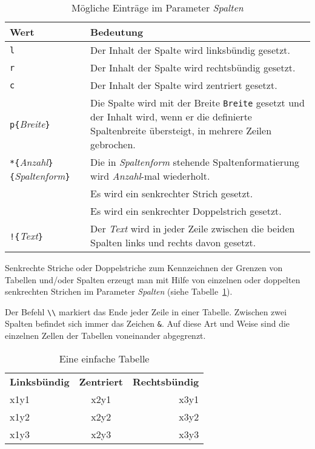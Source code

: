 \begin{table}[htb]
	\centering
	\caption{Mögliche Einträge im Parameter \textsl{Spalten}}
	\label{Tabelle_Spaltenformatierungseintrag}       %
	\begin{tabularx}{\textwidth}{lX}
		\hline
		Wert & Bedeutung \\
		\hline
		\texttt{l} & Der Inhalt der Spalte wird linksbündig gesetzt. \\
		\texttt{r} & Der Inhalt der Spalte wird rechtsbündig gesetzt. \\
		\texttt{c} & Der Inhalt der Spalte wird zentriert gesetzt. \\
		\texttt{p\{}\textsl{Breite}\texttt{\}} & Die Spalte wird mit der Breite \texttt{Breite} gesetzt und der Inhalt wird, wenn er die definierte Spaltenbreite übersteigt, in mehrere Zeilen gebrochen.  \\
		\texttt{*\{}\textsl{Anzahl}\texttt{\}\{}\textsl{Spaltenform}\texttt{\}} & 
		Die in \textsl{Spaltenform} stehende Spaltenformatierung 
		wird \textsl{Anzahl}-mal wiederholt. \\
		\texttt{\textbar} & Es wird ein senkrechter Strich gesetzt. \\
		\texttt{\textbar\textbar} & Es wird ein senkrechter Doppelstrich gesetzt. \\
		\texttt{!\{}\textsl{Text}\texttt{\}} & Der \textsl{Text} wird in jeder Zeile
		zwischen die beiden 
		Spalten links und rechts davon gesetzt.  \\
		\hline
	\end{tabularx}
\end{table}


Senkrechte Striche oder Doppelstriche zum Kennzeichnen der 
Grenzen von Tabellen und/oder Spalten erzeugt man mit 
Hilfe von einzelnen oder doppelten 
senkrechten Strichen im Parameter \textsl{Spalten} 
(siehe Tabelle~\ref{Tabelle_Spaltenformatierungseintrag}).




Der Befehl \verb!\\! markiert das Ende jeder Zeile in einer Tabelle.
Zwischen zwei Spalten befindet sich immer das Zeichen \verb!&!. Auf diese
Art und Weise sind die einzelnen Zellen der Tabellen voneinander abgegrenzt.


\begin{table}[htb]
	\centering
	\caption{Eine einfache Tabelle}
	\label{Tabelle_Spaltenformatierungseintrag1}
	\begin{tabular}{lcr}
		\textbf{Linksbündig} & \textbf{Zentriert} & \textbf{Rechtsbündig} \\
		x1y1 & x2y1 & x3y1 \\
		x1y2 & x2y2 & x3y2 \\
		x1y3 & x2y3 & x3y3 \\
	\end{tabular}
\end{table}

